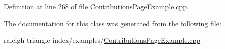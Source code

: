 Definition at line 268 of file Contributions\+Page\+Example.\+cpp.



The documentation for this class was generated from the following file\+:\begin{DoxyCompactItemize}
\item 
raleigh-\/triangle-\/index/examples/\hyperlink{_contributions_page_example_8cpp}{Contributions\+Page\+Example.\+cpp}\end{DoxyCompactItemize}
